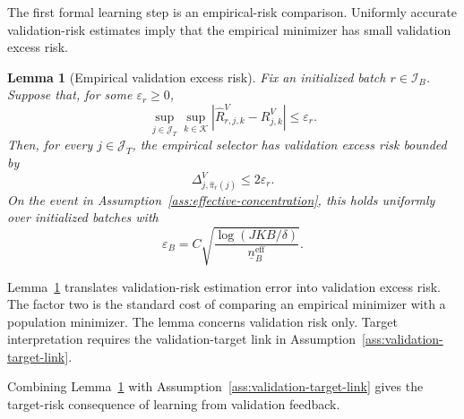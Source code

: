 \documentclass[a4paper, 12pt]{article}
\theoremstyle{plain}
\newtheorem{lemma}{Lemma}
\theoremstyle{remark}
\newcommand{\Kcal}{\mathcal{K}}
\newcommand{\1}{\mathbf{1}}
\begin{document}
The first formal learning step is an empirical-risk comparison. Uniformly accurate validation-risk estimates imply that the empirical minimizer has small validation excess risk.

\begin{lemma}[Empirical validation excess risk]
\label{lem:empirical-validation-risk}
Fix an initialized batch \(r\in\mathcal I_B\). Suppose that, for some \(\varepsilon_r\geq0\),
\begin{equation*}
    \sup_{j\in\mathcal J_T}\sup_{k\in\Kcal}
    \left|\widehat R^V_{r,j,k}-R^V_{j,k}\right|
    \leq \varepsilon_r .
\end{equation*}
Then, for every \(j\in\mathcal J_T\), the empirical selector has validation excess risk bounded by
\begin{equation*}
    \Delta^V_{j,\widehat\pi_r(j)}\leq 2\varepsilon_r .
\end{equation*}
On the event in Assumption~\ref{ass:effective-concentration}, this holds uniformly over initialized batches with
\begin{equation}
\label{eq:epsilon-B}
    \varepsilon_B
    =
    C
    \sqrt{
    \frac{\log(JKB/\delta)}{\underline n^{\mathrm{eff}}_B}
    } .
\end{equation}
\end{lemma}

Lemma~\ref{lem:empirical-validation-risk} translates validation-risk estimation error into validation excess risk. The factor two is the standard cost of comparing an empirical minimizer with a population minimizer. The lemma concerns validation risk only. Target interpretation requires the validation-target link in Assumption~\ref{ass:validation-target-link}.

Combining Lemma~\ref{lem:empirical-validation-risk} with Assumption~\ref{ass:validation-target-link} gives the target-risk consequence of learning from validation feedback.
\end{document}
